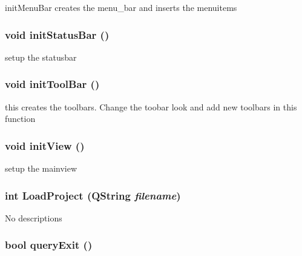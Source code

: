 initMenuBar creates the menu\_\-bar and inserts the menuitems \hypertarget{class_bxbuilder_app_c3e521a0308f0922cc977d844a70446d}{
\subsubsection[{initStatusBar}]{\setlength{\rightskip}{0pt plus 5cm}void initStatusBar ()}}
\label{class_bxbuilder_app_c3e521a0308f0922cc977d844a70446d}


setup the statusbar \hypertarget{class_bxbuilder_app_d5414532a5173cf4300aa970df739927}{
\subsubsection[{initToolBar}]{\setlength{\rightskip}{0pt plus 5cm}void initToolBar ()}}
\label{class_bxbuilder_app_d5414532a5173cf4300aa970df739927}


this creates the toolbars. Change the toobar look and add new toolbars in this function \hypertarget{class_bxbuilder_app_afcf982312922a03e9bb1f072c10b3ca}{
\subsubsection[{initView}]{\setlength{\rightskip}{0pt plus 5cm}void initView ()}}
\label{class_bxbuilder_app_afcf982312922a03e9bb1f072c10b3ca}


setup the mainview \hypertarget{class_bxbuilder_app_321d70a96fbd3ed6bfd87e78e9a67e3a}{
\subsubsection[{LoadProject}]{\setlength{\rightskip}{0pt plus 5cm}int LoadProject (QString {\em filename})}}
\label{class_bxbuilder_app_321d70a96fbd3ed6bfd87e78e9a67e3a}


No descriptions \hypertarget{class_bxbuilder_app_ebc4099d6b19d2cf5e1426f347023e85}{
\subsubsection[{queryExit}]{\setlength{\rightskip}{0pt plus 5cm}bool queryExit ()}}
\label{class_bxbuilder_app_ebc4099d6b19d2cf5e1426f347023e85}


